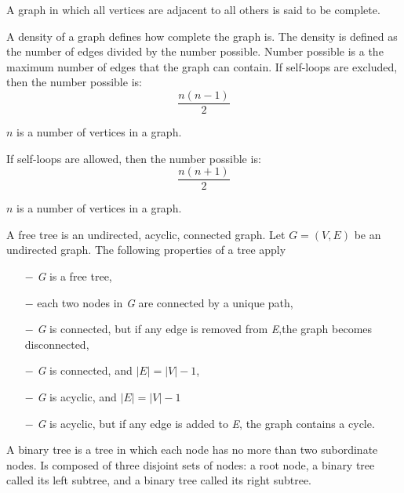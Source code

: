 	\newpage
	\begin{definition}
	A graph in which all vertices are adjacent to all others is said to be complete. 
	\end{definition}
	\begin{definition}
	A density of a graph defines how complete the graph is. The density is defined as the number of edges divided by the number possible. Number possible is a the maximum number of edges that the graph can contain.
	If self-loops are excluded, then the number possible is:\\
	\begin{equation}\label{acyclic_density}
	\frac{n(n-1)}{2}
	\end{equation}
	\begin{eqwhere}
		$n$ is a number of vertices in a graph.\\
	\end{eqwhere}
	If self-loops are allowed, then the number possible is:
	\begin{equation}\label{cyclic_density}
		\frac{n(n+1)}{2}
		\end{equation}
		\begin{eqwhere}
			$n$ is a number of vertices in a graph.
		\end{eqwhere}
		
	\end{definition}
\begin{definition}
A free tree is an undirected, acyclic, connected graph. Let $G = (V,E)$ be an undirected graph. The following properties of a tree apply \\
\begin{itemize}
	\item[$-$] \textit{G} is a free tree,
	\item[$-$] each two nodes in \textit{G} are connected by a unique path,
	\item[$-$] \textit{G} is connected, but if any edge is removed from \textit{E},the graph becomes disconnected,
	\item[$-$] \textit{G} is connected, and $|E| = |V| - 1$,
	\item[$-$] \textit{G} is acyclic, and $|E| = |V| - 1$
	\item[$-$] \textit{G} is acyclic, but if any edge is added to \textit{E}, the graph contains a cycle. 
	\end{itemize}
\end{definition}
\begin{definition}
A binary tree is a tree in which each node has no more than two subordinate nodes. Is composed of three disjoint sets of nodes: a root node, a binary tree called its left subtree, and a binary tree called its right subtree.
\end{definition}
